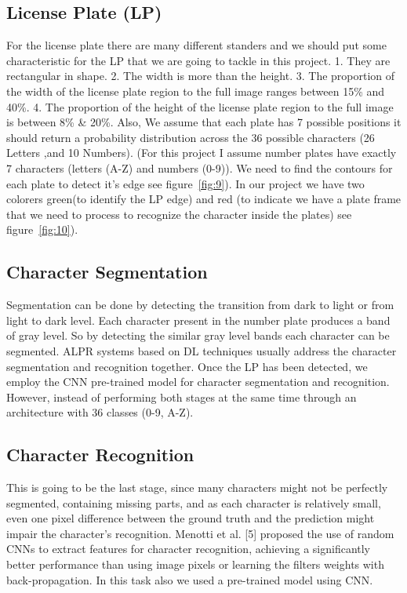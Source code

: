 \documentclass[letterpaper,12pt]{article}
\begin{document}
\subsection{License Plate (LP)}
For the license plate there are many different standers and we should put some characteristic for the LP that we are going to tackle in this project. 1. They are rectangular in shape. 2. The width is more than the height. 3. The proportion of the width of the license plate region to the full image ranges between 15\% and 40\%. 4. The proportion of the height of the license plate region to the full image is between 8\% \& 20\%. Also, We assume that each plate has 7 possible positions it should return a probability distribution across the 36 possible characters (26 Letters ,and 10 Numbers). (For this project I assume number plates have exactly 7 characters (letters (A-Z) and numbers (0-9)). We need to find the contours for each plate to detect it's edge see figure~\ref{fig:9}). In our project we have two colorers green(to identify the LP edge) and red (to indicate we have a plate frame that we need to process to recognize the character inside the plates) see figure~\ref{fig:10}).


\subsection{Character Segmentation}
Segmentation can be done by detecting the transition from dark to light or from light to dark level. Each character present in the number plate produces a band of gray level. So by detecting the similar gray level bands each character can be segmented. ALPR systems based on DL techniques usually address the character segmentation and recognition together. Once the LP has been detected, we employ the CNN pre-trained model for character segmentation and recognition. However, instead of performing both stages at the same time through an architecture with 36 classes (0-9, A-Z).

\subsection{Character Recognition}
This is going to be the last stage, since many characters might not be perfectly segmented, containing missing parts, and as each character is relatively small, even one pixel difference  between the ground truth and the prediction might impair the character’s recognition. Menotti et al. [5] proposed the use of random CNNs to extract features for character recognition,
achieving a significantly better performance than using image pixels or learning the filters weights with back-propagation. In this task also we used a pre-trained model using CNN.
\end{document}
